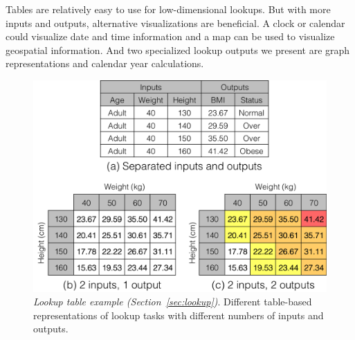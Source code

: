 \documentclass{sig-alternate}
\begin{document}
Tables are relatively easy to use for low-dimensional lookups. But with more inputs and outputs, alternative visualizations are beneficial. A clock or calendar could visualize date and time information and a map can be used to visualize geospatial information. And two specialized lookup outputs we present are graph representations and calendar year calculations.


\begin{figure}
\centering
\includegraphics[width=\linewidth]{img/table.png}
\caption{\emph{Lookup table example (Section~\ref{sec:lookup})}. Different table-based representations of lookup tasks with different numbers of inputs and outputs.}
\label{fig:table}
\end{figure}

\end{document}
